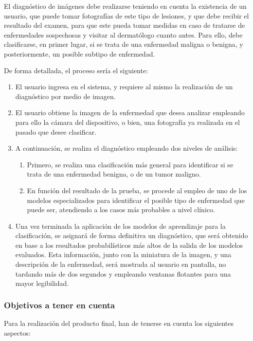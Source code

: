 El diagnóstico de imágenes debe realizarse teniendo en cuenta la existencia de un usuario, que puede tomar fotografías de este tipo de lesiones, y que debe recibir el resultado del examen, para que este pueda tomar medidas en caso de tratarse de enfermedades sospechosas y visitar al dermatólogo cuanto antes. Para ello, debe clasificarse, en primer lugar, si se trata de una enfermedad maligna o benigna, y posteriormente, un posible subtipo de enfermedad.

De forma detallada, el proceso sería el siguiente:

\begin{enumerate}
	\item El usuario ingresa en el sistema, y requiere al mismo la realización de un diagnóstico por medio de imagen.
	\item El usuario obtiene la imagen de la enfermedad que desea analizar empleando para ello la cámara del dispositivo, o bien, una fotografía ya realizada en el pasado que desee clasificar.
	\item A continuación, se realiza el diagnóstico empleando dos niveles de análisis: 
	\begin{enumerate}
		\item Primero, se realiza una clasificación más general para identificar si se trata de una enfermedad benigna, o de un tumor maligno.
		\item En función del resultado de la prueba, se procede al empleo de uno de los modelos especializados para identificar el posible tipo de enfermedad que puede ser, atendiendo a los casos más probables a nivel clínico.
	\end{enumerate}
	\item Una vez terminada la aplicación de los modelos de aprendizaje para la clasificación, se asignará de forma definitiva un diagnóstico, que será obtenido en base a los resultados probabilísticos más altos de la salida de los modelos evaluados. Esta información, junto con la miniatura de la imagen, y una descripción de la enfermedad, será mostrada al usuario en pantalla, no tardando más de dos segundos y empleando ventanas flotantes para una mayor legibilidad.
\end{enumerate}

\subsubsection{Objetivos a tener en cuenta}

Para la realización del producto final, han de tenerse en cuenta los siguientes aspectos:

